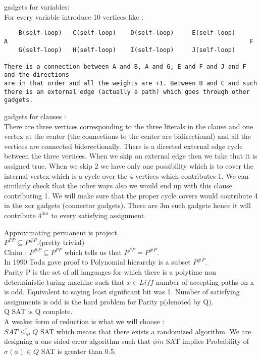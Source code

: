 \documentclass[solution,addpoints,12pt]{exam}
\begin{document}
gadgets for variables:\\
For every variable introduce 10 vertices like :\\
\begin{verbatim}
    B(self-loop)   C(self-loop)    D(self-loop)     E(self-loop)
A                                                                   F
    G(self-loop)   H(self-loop)    I(self-loop)     J(self-loop)

There is a connection between A and B, A and G, E and F and J and F and the directions
are in that order and all the weights are +1. Between B and C and such
there is an external edge (actually a path) which goes through other gadgets.

\end{verbatim}
gadgets for clauses :\\
There are three vertices corresponding to the three literals
in the clause and one vertex at the center (the connections to the center
are bidirectional) and all the vertices are connected biderectionally.
There is a directed external edge cycle between the three vertices.
When we skip an external edge then we take that it is assigned true.
When we skip 2 we have only one possibility which is to cover the internal
vertex which is a cycle over the 4 vertices which contributes 1.
We can similarly check that the other ways also we would end up with
this clause contributing 1. We will make sure that the proper
cycle covers would contribute 4 in the xor gadgets (connector gadgets).
There are 3m such gadgets hence it will contribute $4^{3m}$ to
every satisfying assignment.

Approximating permanent is project.\\

$P^{PP} \subseteq P^{\#P}$.(pretty trivial)\\
Claim : $P^{\#P} \subseteq P^{PP}$ which tells us that
$P^{PP} = P^{\#P}$.\\
In 1990 Toda gave proof to Polynomial hierarchy is a subset
$P^{\#P}$.\\

Parity P is the set of all languages for which there
is a polytime non deterministic turing machine such
that $x \in L iff$ number of accepting paths on x is odd.
Equivalent to saying least significant bit was 1.
Number of satisfying assignments is odd is the hard
problem for Parity p(denoted by Q).\\
Q SAT is Q complete.\\
A weaker form of reduction is what we will choose :\\
$SAT \le_{M}^r Q$ SAT which means that there exists a randomized
algorithm. We are designing a one sided error algorithm
such that $\phi in$ SAT implies Probability of
$\sigma(\phi) \in Q$ SAT is greater than 0.5.\\
\end{document}
